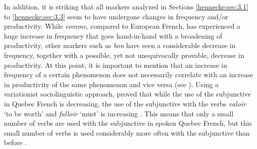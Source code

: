 \documentclass[output=paper]{langscibook}
\begin{document}
In addition, it is striking that all markers analyzed in Sections \ref{hennecke:sec:3.1} to \ref{hennecke:sec:3.3} seem to have undergone changes in frequency and/or productivity. While \textit{comme}, compared to European French, has experienced a huge increase in frequency that goes hand-in-hand with a broadening of productivity, other markers such as \textit{bon} have seen a considerable decrease in frequency, together with a possible, yet not unequivocally provable, decrease in productivity. At this point, it is important to mention that an increase in frequency of a certain phenomenon does not necessarily correlate with an increase in productivity of the same phenomenon and vice versa (see \citealt{Poplack.2001,Poplack.2010}). Using a variationist sociolinguistic approach, \citet{Poplack.2001} proved that while the use of the subjunctive in Quebec French is decreasing, the use of the subjunctive with the verbs \textit{valoir} ‘to be worth’ and \textit{falloir} ‘must’ is increasing \citep{Poplack.2010}. This means that only a small number of verbs are used with the subjunctive in spoken Quebec French, but this small number of verbs is used considerably more often with the subjunctive than before \citep{Poplack.2010}. 
\end{document}
